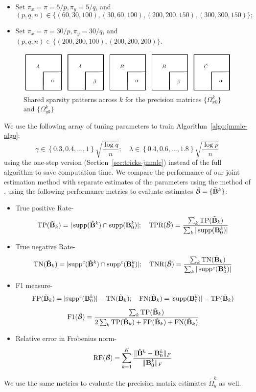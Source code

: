\begin{itemize}
\item Set $\pi_x = \pi = 5/p, \pi_y = 5/q$, and
%
$$
(p,q,n) \in \{ (60,30,100), (30,60,100), (200,200,150), (300,300,150) \};
$$

\item Set $\pi_x = \pi = 30/p, \pi_y = 30/q$, and $(p,q,n) \in  \{ (200,200,100), (200,200,200) \}$.
\end{itemize}
%

\begin{figure}
\centering
\includegraphics{omega-structure}
\caption{Shared sparsity patterns across $k$ for the precision matrices $\{ \Omega_{x0}^k\}$ and $\{ \Omega_{y0}^k\}$}
\label{fig:sim-structure}
\end{figure}

We use the following array of tuning parameters to train Algorithm~\ref{algo:jmmle-algo}:
%
$$
\gamma \in \left\{ 0.3, 0.4, ..., 1 \right\} \sqrt{\frac{\log q}{n}}; \quad
\lambda \in \left\{ 0.4, 0.6, ..., 1.8 \right\} \sqrt{\frac{\log p}{n}}
$$
%
using the one-step version (Section~\ref{sec:tricks-jmmle}) instead of the full algorithm to save computation time. We compare the performance of our joint estimation method with separate estimates of the parameters using the method of \cite{LinEtal16}, using the following performance metrics to evaluate estimates $\tilde {{\cal{B}}} = \{ \tilde {{\mathbf{B}}}^k \}$:

\begin{itemize}
\item True positive Rate-
%
\[
\text{TP}(\tilde {{\mathbf{B}}}_k) = | \operatorname*{supp}(\hat {{\mathbf{B}}}^k) \cap \operatorname*{supp} ({\mathbf{B}}_0^k)|; \quad
\text{TPR} (\tilde {{\cal{B}}}) = \frac{\sum_k \text{TP}(\tilde {{\mathbf{B}}}_k) }{\sum_k | \operatorname*{supp} ({\mathbf{B}}_0^k)| }
\]
\item True negative Rate-
%
\[
\text{TN}(\tilde {{\mathbf{B}}}_k) = | {\operatorname*{supp}}^c (\hat {{\mathbf{B}}}^k) \cap {\operatorname*{supp}}^c ({\mathbf{B}}_0^k)|; \quad
\text{TNR} (\tilde {{\cal{B}}}) = \frac{\sum_k \text{TN}(\tilde {{\mathbf{B}}}_k) }{\sum_k | \operatorname*{supp}^c ({\mathbf{B}}_0^k)| }
\]
%
\item F1 measure-
%
$$
\text{FP}(\tilde {{\mathbf{B}}}_k) = | {\operatorname*{supp}}^c ({\mathbf{B}}^k_0) | - \text{TN}(\tilde {{\mathbf{B}}}_k); \quad
\text{FN}(\tilde {{\mathbf{B}}}_k) = | {\operatorname*{supp}} ({\mathbf{B}}^k_0) | - \text{TP}(\tilde {{\mathbf{B}}}_k) $$
$$ \text{F1} (\tilde {{\cal{B}}}) = \frac{ \sum_k \text{TP}(\tilde {{\mathbf{B}}}_k)}
{2 \sum_k \text{TP}(\tilde {{\mathbf{B}}}_k) + \text{FP}(\tilde {{\mathbf{B}}}_k) + \text{FN}(\tilde {{\mathbf{B}}}_k)}
$$
%
\item Relative error in Frobenius norm-
%
\[
\text{RF} (\tilde {{\cal{B}}}) = \sum_{k=1}^K \frac{\| \hat {{\mathbf{B}}}^k - {\mathbf{B}}_0^k \|_F}{\| {\mathbf{B}}_0^k \|_F}
\]
%
\end{itemize}
%
We use the same metrics to evaluate the precision matrix estimates $\tilde \Omega_y^k$ as well.

